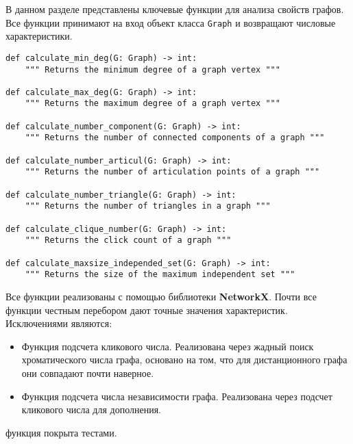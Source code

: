 

В данном разделе представлены ключевые функции для анализа свойств графов. Все функции принимают на вход объект класса \texttt{Graph} и возвращают числовые характеристики.

\begin{lstlisting}
def calculate_min_deg(G: Graph) -> int:
    """ Returns the minimum degree of a graph vertex """

def calculate_max_deg(G: Graph) -> int:
    """ Returns the maximum degree of a graph vertex """

def calculate_number_component(G: Graph) -> int:
    """ Returns the number of connected components of a graph """

def calculate_number_articul(G: Graph) -> int:
    """ Returns the number of articulation points of a graph """

def calculate_number_triangle(G: Graph) -> int:
    """ Returns the number of triangles in a graph """

def calculate_clique_number(G: Graph) -> int:
    """ Returns the click count of a graph """

def calculate_maxsize_independed_set(G: Graph) -> int:
    """ Returns the size of the maximum independent set """
\end{lstlisting}

\noindent Все функции реализованы с помощью библиотеки \textbf{NetworkX}. Почти все функции честным перебором дают точные значения характеристик.\\
Исключениями являются:

\begin{itemize}
    \item Функция подсчета кликового числа. Реализована через жадный поиск хроматического числа графа, основано на том, что для дистанционного графа они совпадают почти наверное.

    \item Функция подсчета числа независимости графа. Реализована через подсчет кликового числа для дополнения.
\end{itemize}

 функция покрыта тестами.
